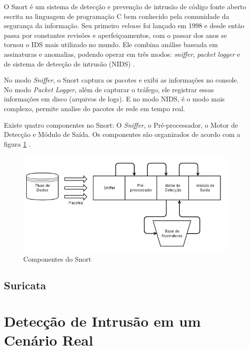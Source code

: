 \documentclass[
	12pt,				
	openright,		
	twoside,	
	a4paper,
	english,	
	brazil	
	]{abntex2}
\begin{document}
O Snort é um sistema de detecção e prevenção de intrusão de código fonte aberto escrita na linguagem de programação C bem conhecido pela comunidade da segurança da informação. Seu primeiro \textit{release} foi lançado em 1998 e desde então passa por constantes revisões e aperfeiçoamentos, com o passar dos anos se tornou o IDS mais utilizado no mundo. Ele combina análise baseada em assinaturas e anomalias, podendo operar em três modos: \textit{sniffer}, \textit{packet logger} e de sistema de detecção de intrusão (NIDS) \cite{snortorgbr}.

No modo \textit{Sniffer}, o Snort captura os pacotes e exibi as informações no console. No modo \textit{Packet Logger}, além de capturar o tráfego, ele registrar essas informações em disco (arquivos de logs). E no modo NIDS, é o modo mais complexo, permite analise do pacotes de rede em tempo real.

Existe quatro componentes no Snort: O \textit{Sniffer}, o Pré-processador, o Motor de Detecção e Módulo de Saída. Os componentes são organizados de acordo com a figura \ref{snort-componentes} \cite{kohlenberg2007snort}.

\begin{figure}[!htp]
  \centering
  \includegraphics[scale=0.6]{snort_componentes}
  \caption{Componentes do Snort}
  \label{snort-componentes}
\end{figure}

\section{Suricata}

\chapter{Detecção de Intrusão em um Cenário Real}
\end{document}
